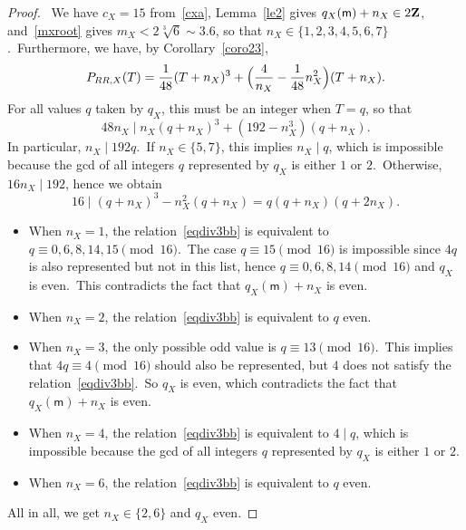 \documentclass[12pt]{amsart}
\def\Z{{\bf Z}}
\theoremstyle{remark}
\def\lll{\ensuremath{\mathsf l}}
\def\mm{\ensuremath{\mathsf m}}
\begin{document}
\begin{proof}
 \medskip
\noindent{\bf{Assume  $ q_X(\lll,\mm)=1 $.}}\ We have $c_X=15$ from~\eqref{cxa}, Lemma~\ref{le2} gives $q_X(\mm)+n_X\in 2\Z$, and~\eqref{mxroot} gives $m_X<2\sqrt[3]{6}\sim 3.6 $, so that $n_X \in\{1,2,3,4,5,6,7\}$.\ Furthermore, we have, by Corollary~\ref{coro23}, 
$$P_{RR,X}(T)=\frac{1}{48}(T+n_X)^3+\Bigl(\frac{4}{n_X}-\frac{1}{48}n_X^2\Bigr)(T+n_X).
$$
 For all values $q$ taken by $q_X$, this must be an integer when $T=q$, so that
\begin{equation}\label{eqdiv3b}
48n_X\mid   n_X(q+n_X)^3+ (192- n_X^3 )(q+n_X).
\end{equation}
 In particular, $n_X\mid 192 q$.\ If $n_X\in\{5,7\}$, this implies $n_X\mid  q$, which is impossible because   the gcd of all integers $q$ represented by $q_X$ is either $1$ or $2$.\ Otherwise, $16n_X\mid 192$, hence we obtain
\begin{equation}\label{eqdiv3bb}
16 \mid  (q+n_X)^3 - n_X^2  (q+n_X)=q(q+n_X)(q+2n_X).
\end{equation}
\begin{itemize}
\item When $n_X=1$, the relation~\eqref{eqdiv3bb} is equivalent to  $q\equiv 0,6,8,14,15\pmod{16}$.\ The case $q\equiv  15\pmod{16}$ is impossible since $4q$ is also represented but not in this list, hence $q\equiv 0,6,8,14\pmod{16}$ and $q_X$ is even.\ This contradicts the fact that $q_X(\mm)+n_X$ is even.
\item When $n_X=2$,  the relation~\eqref{eqdiv3bb} is equivalent to   $q $ even.
\item When $n_X=3$, the only possible odd value is $q\equiv 13\pmod{16}$.\ This implies that  $4q\equiv 4\pmod{16}$ should also be represented, but $4$ does not satisfy the relation~\eqref{eqdiv3bb}.\ So $q_X$ is even, which contradicts the fact that $q_X(\mm)+n_X$ is even.
\item When $n_X=4$,  the relation~\eqref{eqdiv3bb} is equivalent to  $4\mid q$, which is impossible because   the gcd of all integers $q$ represented by $q_X$ is either $1$ or $2$. 
\item When $n_X=6$,  the relation~\eqref{eqdiv3bb}  is equivalent to  $q $ even.
 \end{itemize}
All in all, we get $n_X \in\{2,6 \}$ and $q_X$ even.
 

\medskip


\end{proof}
\end{document}
